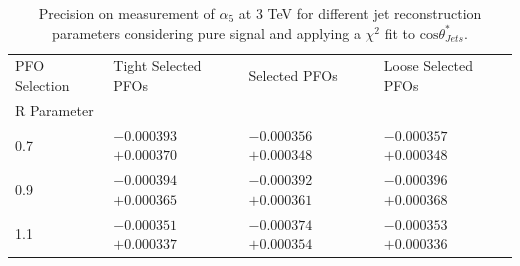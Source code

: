 \begin{table}[h!]
\centering
\begin{tabular}{ l l l l }
\hline
PFO Selection & Tight Selected PFOs & Selected PFOs & Loose Selected PFOs \\ 
R Parameter & & & \\ 
\hline
0.7 & $-0.000393$ $+0.000370$ & $-0.000356$ $+0.000348$ & $-0.000357$ $+0.000348$ \\
0.9 & $-0.000394$ $+0.000365$ & $-0.000392$ $+0.000361$ & $-0.000396$ $+0.000368$ \\
1.1 & $-0.000351$ $+0.000337$ & $-0.000374$ $+0.000354$ & $-0.000353$ $+0.000336$ \\
\hline
\end{tabular}
\caption[$1\sigma$ precision on measurement of $\alpha_{5}$ for different jet reconstruction parameters considering pure signal at 3 TeV.]{Precision on measurement of $\alpha_{5}$ at 3 TeV for different jet reconstruction parameters considering pure signal and applying a $\chi^{2}$ fit to $\text{cos}\theta^{*}_{Jets}$.}
\label{table:precisiona5signaljetalgo3000GeV}
\end{table}

